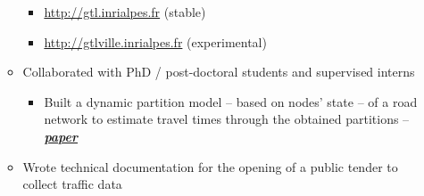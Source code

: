 \documentclass{article}
\begin{document}
\begin{minipage}{0.8\textwidth}
\begin{flushleft}
\begin{itemize}
\begin{itemize}[leftmargin=*]
            \vspace{-.15cm}
            \begin{itemize}[leftmargin=*]
            \setlength\itemsep{.01cm}
                \item \url{http://gtl.inrialpes.fr} (stable)
                \item \url{http://gtlville.inrialpes.fr} (experimental)
            \end{itemize}
            \item Collaborated with PhD / post-doctoral students and supervised interns
                \vspace{-.15cm}
                \begin{itemize}[leftmargin=*]
                \setlength\itemsep{.01cm}
                    \item Built a dynamic partition model – based on nodes’ state – of a road network to estimate travel times through the obtained partitions – \textbf{\textit{\href{https://hal.archives-ouvertes.fr/hal-01953560}{paper}}}
                \end{itemize}
            \item Wrote technical documentation for the opening of a public tender to collect traffic data
        \end{itemize}
    \end{itemize}
\end{flushleft}
\end{minipage}
\hfill\vline\hfill
\end{document}
